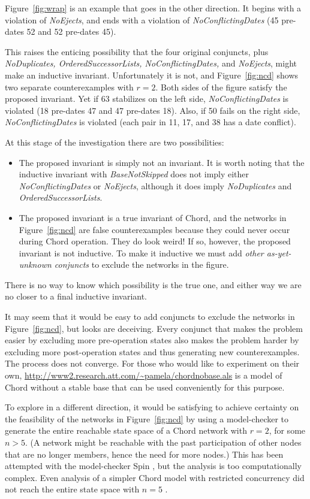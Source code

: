 \documentclass[conference]{IEEEtran}
\begin{document}
Figure~\ref{fig:wrap} is an example that goes in the other direction.
It begins with a violation of
{\it NoEjects}, and ends with a violation of
{\it NoConflictingDates} (45 pre-dates 52 and 52 pre-dates 45).

This raises the enticing possibility that the four original
conjuncts, plus {\it NoDuplicates, OrderedSuccessorLists, 
NoConflictingDates,} and {\it NoEjects}, might make an inductive
invariant.
Unfortunately it is not, and
Figure~\ref{fig:ncd} shows two separate counterexamples
with $r = 2$.
Both sides of the figure satisfy the proposed invariant.
Yet if 63 stabilizes on the left side, 
{\it NoConflictingDates} is violated (18 pre-dates 47 and 47 pre-dates
18).
Also, if 50 fails on the right side,
{\it NoConflictingDates} is violated (each pair in 11, 17, and 38 has
a date conflict).

At this stage of the investigation there are two possibilities:
\begin{itemize}
\item
The proposed invariant is simply not an invariant.
It is worth noting that the inductive invariant with {\it BaseNotSkipped}
does not imply either {\it NoConflictingDates} or
{\it NoEjects}, although it does imply {\it NoDuplicates} and
{\it OrderedSuccessorLists}.
\item
The proposed invariant is a true invariant of Chord, and
the networks in Figure~\ref{fig:ncd} are false counterexamples
because they could never occur during Chord operation.
They do look weird!
If so, however, the proposed invariant is not inductive.
To make it inductive we must add {\it other as-yet-unknown
conjuncts} to exclude the networks in the figure.
\end{itemize}
There is no way to know which possibility is the true one, and
either way we are no closer to a final inductive invariant.

It may seem that it would be easy to add conjuncts to exclude
the networks in Figure~\ref{fig:ncd}, but looks are deceiving.
Every conjunct that makes the problem easier by excluding 
more pre-operation
states also makes the problem harder by excluding more
post-operation states and thus generating new counterexamples.
The process does not converge.
For those who would like to experiment on their own,
\url{http://www2.research.att.com/~pamela/chordnobase.als}
is a model of Chord without a stable base that can be used
conveniently for this purpose.

To explore in a different direction,
it would be satisfying to achieve certainty on the feasibility
of the networks in Figure~\ref{fig:ncd} by 
using a model-checker to generate the entire reachable state space of a
Chord network with $r = 2$, for some $n > 5$.
(A network might be reachable with the past participation
of other nodes that are no longer members, hence the need for more
nodes.)
This has been attempted with the model-checker Spin \cite{spin}, but
the analysis is too computationally complex.
Even analysis of a simpler Chord model with restricted concurrency
did not reach the entire state space with $n = 5$ \cite{compare}.
\end{document}
